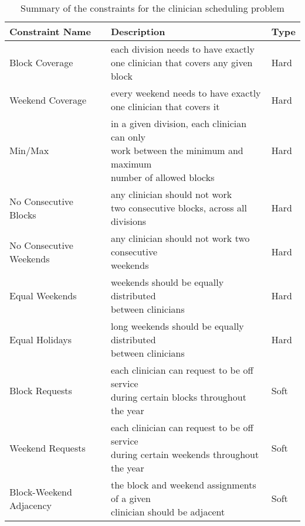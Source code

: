 \begin{table}[h]
	\centering
	\begin{tabular}{ l l l }
		\hline
		\textbf{Constraint Name} & \textbf{Description}                                                                                                           & \textbf{Type} \\ \hline
		Block Coverage           & \makecell[l]{each division needs to have exactly \\ one clinician that covers any given block}                                 & Hard          \\ \hline
		Weekend Coverage         & \makecell[l]{every weekend needs to have exactly \\ one clinician that covers it}                                              & Hard          \\ \hline
		Min/Max                  & \makecell[l]{in a given division, each clinician can only \\ work between the minimum and maximum \\ number of allowed blocks} & Hard          \\ \hline
		No Consecutive Blocks    & \makecell[l]{any clinician should not work \\ two consecutive blocks, across all divisions}                                    & Hard          \\ \hline
		No Consecutive Weekends  & \makecell[l]{any clinician should not work two consecutive \\ weekends}                                                        & Hard          \\ \hline
		Equal Weekends           & \makecell[l]{weekends should be equally distributed \\ between clinicians}                                                     & Hard          \\ \hline
		Equal Holidays           & \makecell[l]{long weekends should be equally distributed \\ between clinicians}                                                & Hard          \\ \hline
		Block Requests           & \makecell[l]{each clinician can request to be off service \\ during certain blocks throughout the year}                        & Soft          \\ \hline
		Weekend Requests         & \makecell[l]{each clinician can request to be off service \\ during certain weekends throughout the year}                      & Soft          \\ \hline
		Block-Weekend Adjacency  & \makecell[l]{the block and weekend assignments of a given \\ clinician should be adjacent}                                     & Soft
	\end{tabular}
	\caption{Summary of the constraints for the clinician scheduling problem}
	\label{tbl:constraint-summary}
\end{table}

